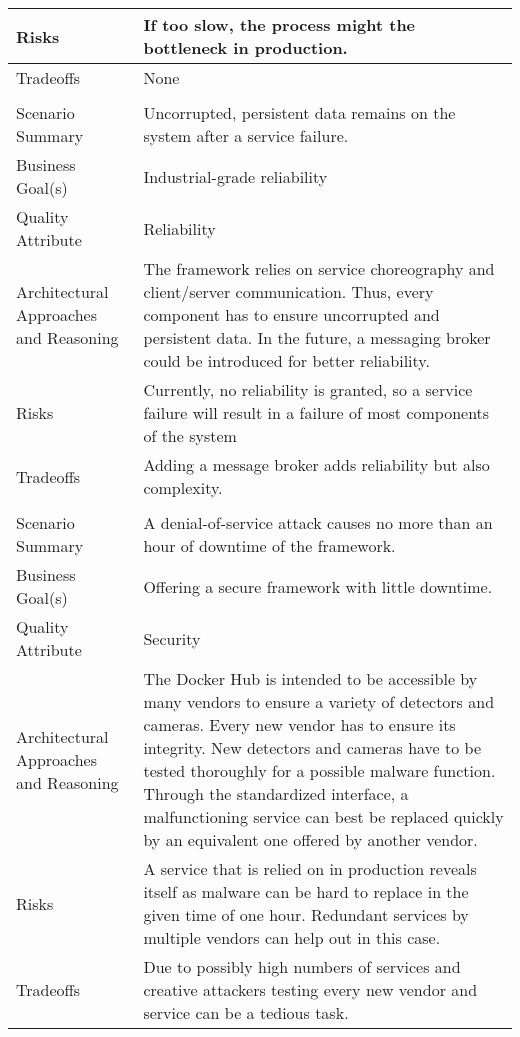 {\begin{longtable}{| P{0.2\textwidth} | P{0.74\textwidth} |}
Risks & If too slow, the process might the bottleneck in production.\\ \hline
Tradeoffs &  None\\ \hline
{}
 \\ \hline
Scenario Summary & Uncorrupted, persistent data remains on the system after a service failure.\\ \hline
Business Goal(s) & Industrial-grade reliability \\ \hline
Quality Attribute & Reliability\\ \hline
Architectural Approaches and Reasoning & The framework relies on service choreography and client/server communication. Thus, every component has to ensure uncorrupted and persistent data. In the future, a messaging broker could be introduced for better reliability.\\ \hline
Risks & Currently, no reliability is granted, so a service failure will result in a failure of most components of the system \\ \hline
Tradeoffs & Adding a message broker adds reliability but also complexity. \\ \hline
{}
 \\ \hline
Scenario Summary & A denial-of-service attack causes no more than an hour of downtime of the framework.\\ \hline
Business Goal(s) & Offering a secure framework with little downtime. \\ \hline
Quality Attribute & Security\\ \hline
Architectural Approaches and Reasoning & The Docker Hub is intended to be accessible by many vendors to ensure a variety of detectors and cameras. Every new vendor has to ensure its integrity. New detectors and cameras have to be tested thoroughly for a possible malware function. Through the standardized interface, a malfunctioning service can best be replaced quickly by an equivalent one offered by another vendor.\\ \hline
Risks &  A service that is relied on in production reveals itself as malware can be hard to replace in the given time of one hour. Redundant services by multiple vendors can help out in this case.\\ \hline
Tradeoffs & Due to possibly high numbers of services and creative attackers testing every new vendor and service can be a tedious task.\\ \hline
\end{longtable}
}